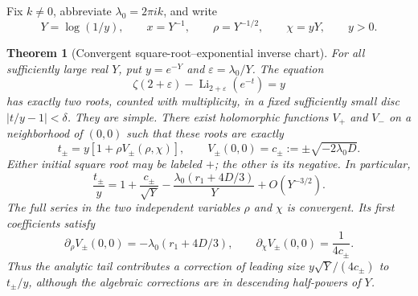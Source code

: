 \documentclass[11pt,a4paper]{article}
\numberwithin{equation}{section}
\newtheorem{theorem}{Theorem}[section]
\theoremstyle{definition}
\theoremstyle{remark}
\DeclareMathOperator{\Li}{Li}
\begin{document}
Fix $k\ne0$, abbreviate $\lambda_0=2\pi i k$, and write
\begin{equation}\label{cx:physical-scales}
 Y=\log(1/y),\qquad x=Y^{-1},\qquad \rho=Y^{-1/2},\qquad
 \chi=yY,\qquad y>0.
\end{equation}

\begin{theorem}[Convergent square-root--exponential inverse chart]
\label{cx:split}
For all sufficiently large real $Y$, put $y=e^{-Y}$ and
$\varepsilon=\lambda_0/Y$.  The equation
\begin{equation}\label{cx:inverse-equation}
 \zeta(2+\varepsilon)-\Li_{2+\varepsilon}(e^{-t})=y
\end{equation}
has exactly two roots, counted with multiplicity, in a fixed sufficiently
small disc $|t/y-1|<\delta$.  They are simple.  There exist holomorphic
functions $V_+$ and $V_-$ on a neighborhood of $(0,0)$ such that these
roots are exactly
\begin{equation}\label{cx:split-exact}
 t_\pm=y\left[1+\rho V_\pm(\rho,\chi)\right],\qquad
 V_\pm(0,0)=c_\pm:=\pm\sqrt{-2\lambda_0D}.
\end{equation}
Either initial square root may be labeled $+$; the other is its negative.
In particular,
\begin{equation}\label{cx:split-first}
 \frac{t_\pm}{y}
 =1+\frac{c_\pm}{\sqrt Y}
   -\frac{\lambda_0(r_1+4D/3)}Y
   +O(Y^{-3/2}).
\end{equation}
The full series in the two independent variables $\rho$ and $\chi$ is
convergent.  Its first coefficients satisfy
\begin{equation}\label{cx:split-coefficients}
 \partial_\rho V_\pm(0,0)=-\lambda_0(r_1+4D/3),\qquad
 \partial_\chi V_\pm(0,0)=\frac1{4c_\pm}.
\end{equation}
Thus the analytic tail contributes a correction of leading size
$y\sqrt Y/(4c_\pm)$ to $t_\pm/y$, although the algebraic corrections
are in descending half-powers of $Y$.
\end{theorem}
\end{document}
